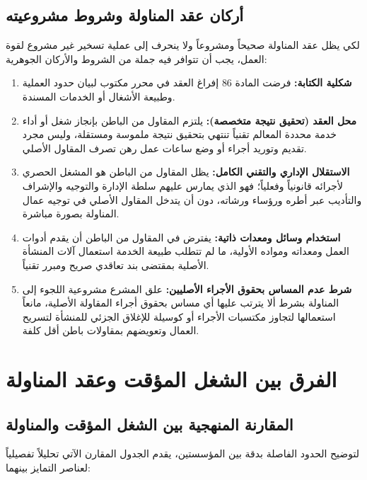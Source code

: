 \subsection{أركان عقد المناولة وشروط مشروعيته}
لكي يظل عقد المناولة صحيحاً ومشروعاً ولا ينحرف إلى عملية تسخير غير مشروع لقوة العمل، يجب أن تتوافر فيه جملة من الشروط والأركان الجوهرية:
\begin{enumerate}[leftmargin=*, itemsep=5pt]
    \item \textbf{شكلية الكتابة:} فرضت المادة \textenglish{86} إفراغ العقد في محرر مكتوب لبيان حدود العملية وطبيعة الأشغال أو الخدمات المسندة.
    \item \textbf{محل العقد (تحقيق نتيجة متخصصة):} يلتزم المقاول من الباطن بإنجاز شغل أو أداء خدمة محددة المعالم تقنياً تنتهي بتحقيق نتيجة ملموسة ومستقلة، وليس مجرد تقديم وتوريد أجراء أو وضع ساعات عمل رهن تصرف المقاول الأصلي.
    \item \textbf{الاستقلال الإداري والتقني الكامل:} يظل المقاول من الباطن هو المشغل الحصري لأجرائه قانونياً وفعلياً؛ فهو الذي يمارس عليهم سلطة الإدارة والتوجيه والإشراف والتأديب عبر أطره ورؤساء ورشاته، دون أن يتدخل المقاول الأصلي في توجيه عمال المناولة بصورة مباشرة.
    \item \textbf{استخدام وسائل ومعدات ذاتية:} يفترض في المقاول من الباطن أن يقدم أدوات العمل ومعداته ومواده الأولية، ما لم تتطلب طبيعة الخدمة استعمال آلات المنشأة الأصلية بمقتضى بند تعاقدي صريح ومبرر تقنياً.
    \item \textbf{شرط عدم المساس بحقوق الأجراء الأصليين:} علق المشرع مشروعية اللجوء إلى المناولة بشرط ألا يترتب عليها أي مساس بحقوق أجراء المقاولة الأصلية، مانعاً استعمالها لتجاوز مكتسبات الأجراء أو كوسيلة للإغلاق الجزئي للمنشأة لتسريح العمال وتعويضهم بمقاولات باطن أقل كلفة.
\end{enumerate}

\section{الفرق بين الشغل المؤقت وعقد المناولة}

\subsection{المقارنة المنهجية بين الشغل المؤقت والمناولة}
لتوضيح الحدود الفاصلة بدقة بين المؤسستين، يقدم الجدول المقارن الآتي تحليلاً تفصيلياً لعناصر التمايز بينهما:

